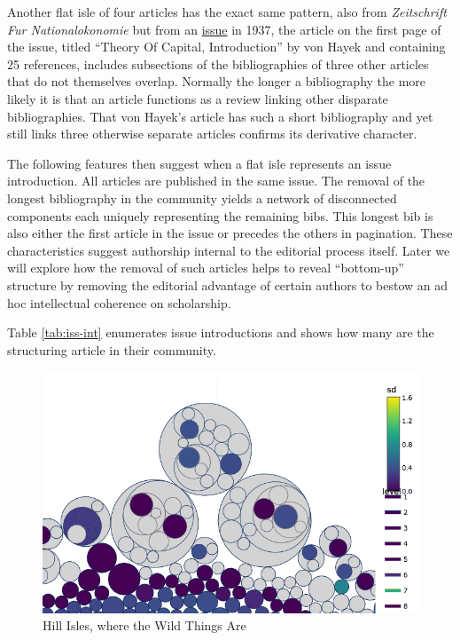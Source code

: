\documentclass[]{book}
\theoremstyle{definition}
\theoremstyle{definition}
\theoremstyle{definition}
\theoremstyle{remark}
\begin{document}
Another flat isle of four articles has the exact same pattern, also from
\emph{Zeitschrift Fur Nationalokonomie} but from an
\href{https://www.jstor.org/stable/i40084262}{issue} in 1937, the
article on the first page of the issue, titled ``Theory Of Capital,
Introduction'' by von Hayek and containing 25 references, includes
subsections of the bibliographies of three other articles that do not
themselves overlap. Normally the longer a bibliography the more likely
it is that an article functions as a review linking other disparate
bibliographies. That von Hayek's article has such a short bibliography
and yet still links three otherwise separate articles confirms its
derivative character.

The following features then suggest when a flat isle represents an issue
introduction. All articles are published in the same issue. The removal
of the longest bibliography in the community yields a network of
disconnected components each uniquely representing the remaining bibs.
This longest bib is also either the first article in the issue or
precedes the others in pagination. These characteristics suggest
authorship internal to the editorial process itself. Later we will
explore how the removal of such articles helps to reveal ``bottom-up''
structure by removing the editorial advantage of certain authors to
bestow an ad hoc intellectual coherence on scholarship.

Table \ref{tab:iss-int} enumerates issue introductions and shows how
many are the structuring article in their community.

\begin{figure}

{\centering \includegraphics[width=0.9\linewidth]{img/hill-isle} 

}

\caption{Hill Isles, where the Wild Things Are}\label{fig:hill-isle}
\end{figure}
\end{document}

